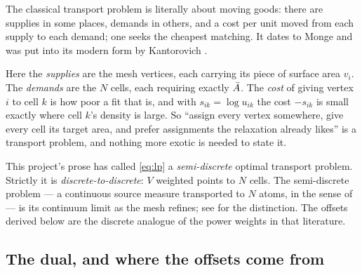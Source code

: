 \documentclass[11pt,a4paper]{article}
\begin{document}
\begin{tcolorbox}[colback=olive!4!white, colframe=olive!55!black,
                  title={Intuition: why this is a \emph{transport} problem},
                  fontupper=\small]
The classical transport problem is literally about moving goods: there are
supplies in some places, demands in others, and a cost per unit moved from each
supply to each demand; one seeks the cheapest matching. It dates to Monge and was
put into its modern form by Kantorovich \cite{villani2003topics}.

Here the \emph{supplies} are the mesh vertices, each carrying its piece of surface
area $v_i$. The \emph{demands} are the $N$ cells, each requiring exactly $\bar{A}$.
The \emph{cost} of giving vertex $i$ to cell $k$ is how poor a fit that is, and
with $s_{ik} = \log u_{ik}$ the cost $-s_{ik}$ is small exactly where cell $k$'s
density is large. So ``assign every vertex somewhere, give every cell its target
area, and prefer assignments the relaxation already likes'' is a transport
problem, and nothing more exotic is needed to state it.
\end{tcolorbox}

\begin{remark}[Terminology]
This project's prose has called \eqref{eq:lp} a \emph{semi-discrete} optimal
transport problem. Strictly it is \emph{discrete-to-discrete}: $V$ weighted points
to $N$ cells. The semi-discrete problem --- a continuous source measure
transported to $N$ atoms, in the sense of
\cite{aurenhammer1998minkowski, merigot2011multiscale, kitagawa2019convergence} ---
is its continuum limit as the mesh refines; see
\cite[\S5]{peyre2019computational} for the distinction. The offsets derived below are the
discrete analogue of the power weights in that literature.
\end{remark}

\subsection{The dual, and where the offsets come from}
\end{document}
